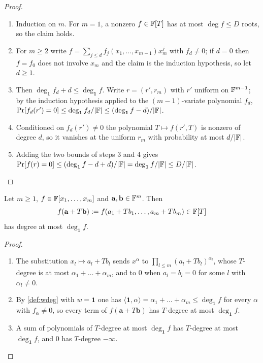 \begin{proof}
\begin{enumerate}
\item Induction on $m$. For $m=1$, a nonzero $f\in\mathbb{F}[T]$ has at most $\deg f\le D$ roots, so the
claim holds.
\item For $m\ge2$ write $f=\sum_{j\le d}f_j(x_1,\dots,x_{m-1})x_m^j$ with $f_d\ne0$; if $d=0$ then
$f=f_0$ does not involve $x_m$ and the claim is the induction hypothesis, so let $d\ge1$.
\item Then $\deg_{\mathbf 1}f_d+d\le\deg_{\mathbf 1}f$. Write $r=(r',r_m)$ with $r'$ uniform on
$\mathbb{F}^{m-1}$; by the induction hypothesis applied to the $(m-1)$-variate polynomial $f_d$,
$\Pr[f_d(r')=0]\le\deg_{\mathbf 1}f_d/|\mathbb{F}|\le(\deg_{\mathbf 1}f-d)/|\mathbb{F}|$.
\item Conditioned on $f_d(r')\ne0$ the polynomial $T\mapsto f(r',T)$ is nonzero of degree $d$, so it
vanishes at the uniform $r_m$ with probability at most $d/|\mathbb{F}|$.
\item Adding the two bounds of steps 3 and 4 gives
$\Pr[f(r)=0]\le(\deg_{\mathbf 1}f-d+d)/|\mathbb{F}|=\deg_{\mathbf 1}f/|\mathbb{F}|\le D/|\mathbb{F}|$.
\end{enumerate}
\end{proof}

\begin{lemma}\label{lem:line-total}
Let $m\ge1$, $f\in\mathbb{F}[x_1,\dots,x_m]$ and $\mathbf a,\mathbf b\in\mathbb{F}^m$. Then
\[
f(\mathbf a+T\mathbf b):=f(a_1+Tb_1,\dots,a_m+Tb_m)\in\mathbb{F}[T]
\]
has degree at most $\deg_{\mathbf 1}f$.
\end{lemma}

\begin{proof}
\begin{enumerate}
\item The substitution $x_l\mapsto a_l+Tb_l$ sends $x^\alpha$ to
$\prod_{l\le m}(a_l+Tb_l)^{\alpha_l}$, whose $T$-degree is at most $\alpha_1+\dots+\alpha_m$, and to
$0$ when $a_l=b_l=0$ for some $l$ with $\alpha_l\ne0$.
\item By \cref{def:wdeg} with $w=\mathbf 1$ one has $\langle\mathbf 1,\alpha\rangle=\alpha_1+\dots+\alpha_m\le\deg_{\mathbf 1}f$
for every $\alpha$ with $f_\alpha\ne0$, so every term of $f(\mathbf a+T\mathbf b)$ has $T$-degree at
most $\deg_{\mathbf 1}f$.
\item A sum of polynomials of $T$-degree at most $\deg_{\mathbf 1}f$ has $T$-degree at most
$\deg_{\mathbf 1}f$, and $0$ has $T$-degree $-\infty$.
\end{enumerate}
\end{proof}

